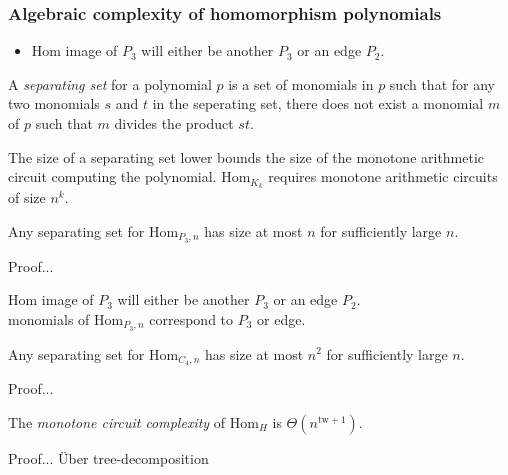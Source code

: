 \subsubsection{Algebraic complexity of homomorphism polynomials}

\begin{itemize}
    \item Hom image of $P_3$ will either be another $P_3$ or an edge $P_2$.\\
    
\end{itemize}

\begin{definition}
    A \textit{separating set} for a polynomial $p$ is a set of monomials in $p$ such that for any two monomials $s$ and $t$ in the seperating set, there does not exist a monomial $m$ of $p$ such that $m$ divides the product $st$.
\end{definition}

\noindent 
The size of a separating set lower bounds the size of the monotone arithmetic circuit computing the polynomial. $\text{Hom}_{K_k}$ requires monotone arithmetic circuits of size $n^k$.

\begin{theorem}
    Any separating set for $\text{Hom}_{P_3,n}$ has size at most $n$ for sufficiently large $n$.
\end{theorem}

Proof...

\noindent
Hom image of $P_3$ will either be another $P_3$ or an edge $P_2$.\\
monomials of Hom$_{P_3,n}$ correspond to $P_3$ or edge.

\begin{theorem}
    Any separating set for Hom$_{C_4,n}$ has size at most $n^2$ for sufficiently large $n$.
\end{theorem}

Proof...

\begin{theorem}\label{thm:mon-circ-complexity}
    The \textit{monotone circuit complexity} of Hom$_{H}$ is $\Theta(n^{\text{tw}+1})$.
\end{theorem}

Proof... Über tree-decomposition 